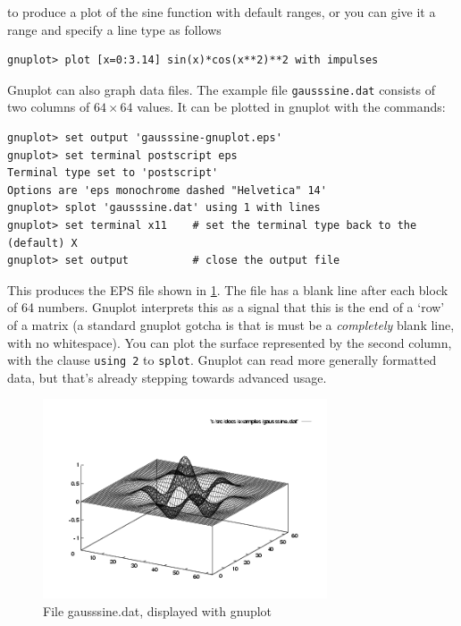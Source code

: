 \documentclass[11pt,oneside,chapters]{starlink}
\begin{document}
to produce a plot of the sine function with default
ranges, or you can give it a range and specify a line type
as follows

\begin{verbatim}
gnuplot> plot [x=0:3.14] sin(x)*cos(x**2)**2 with impulses
\end{verbatim}

Gnuplot can also graph data files.  The example file
\texttt{gausssine.dat} consists of two columns of
$64 \times 64$ values.  It can be
plotted in gnuplot with the commands:

\begin{verbatim}
gnuplot> set output 'gausssine-gnuplot.eps'
gnuplot> set terminal postscript eps
Terminal type set to 'postscript'
Options are 'eps monochrome dashed "Helvetica" 14'
gnuplot> splot 'gausssine.dat' using 1 with lines
gnuplot> set terminal x11    # set the terminal type back to the (default) X
gnuplot> set output          # close the output file
\end{verbatim}

This produces the EPS file shown in \ref{f:gausssine:g}.
The file has a blank line after
each block of 64 numbers.  Gnuplot interprets this as a
signal that this is the end of a `row' of a matrix (a
standard gnuplot gotcha is that is must be a
\emph{completely} blank line, with no whitespace).  You
can plot the surface represented by the second column,
with the clause \texttt{using 2} to
\texttt{splot}.  Gnuplot can read more generally
formatted data, but that's already stepping towards
advanced usage.

\begin{figure}
\center
\includegraphics[width=0.75\textwidth]{sc13-gausssine-gnuplot}
\caption{File gausssine.dat, displayed with
gnuplot
}
\label{f:gausssine:g}
\end{figure}
\end{document}
